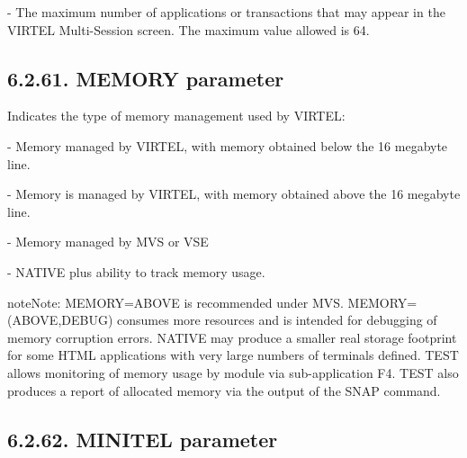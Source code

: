 \documentclass[letterpaper,10pt,english]{sphinxmanual}
\begin{document}
 - The maximum number of applications or transactions that may appear in the VIRTEL Multi-Session screen. The maximum value allowed is 64.


\subsection{6.2.61. MEMORY parameter}
\label{\detokenize{Installation_Guide:memory-parameter}}
\begin{sphinxVerbatim}[commandchars=\\\{\}]
\PYG{p}{[}\PYG{p}{]} 
\end{sphinxVerbatim}

Indicates the type of memory management used by VIRTEL:

 - Memory managed by VIRTEL, with memory obtained below the 16 megabyte line.

 - Memory is managed by VIRTEL, with memory obtained above the 16 megabyte line.

 - Memory managed by MVS or VSE

 - NATIVE plus ability to track memory usage.

\begin{sphinxadmonition}{note}{Note:}
MEMORY=ABOVE is recommended under MVS. MEMORY=(ABOVE,DEBUG) consumes more resources and is intended for debugging of memory corruption errors. NATIVE may produce a smaller real storage footprint for some HTML
applications with very large numbers of terminals defined. TEST allows monitoring of memory usage by module via sub-application F4. TEST also produces a report of allocated memory via the output of the SNAP command.
\end{sphinxadmonition}


\subsection{6.2.62. MINITEL parameter}
\label{\detokenize{Installation_Guide:minitel-parameter}}
\begin{sphinxVerbatim}[commandchars=\\\{\}]
               
\end{sphinxVerbatim}
\end{document}
